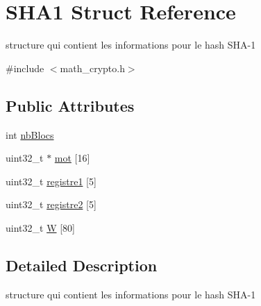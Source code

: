 \hypertarget{structSHA1}{\section{S\-H\-A1 Struct Reference}
\label{structSHA1}
}


structure qui contient les informations pour le hash S\-H\-A-\/1  




{\ttfamily \#include $<$math\-\_\-crypto.\-h$>$}

\subsection*{Public Attributes}
\begin{DoxyCompactItemize}
\item 
int \hyperlink{structSHA1_a7786a6dad7d75fbcba1208cf88d113df}{nb\-Blocs}
\item 
uint32\-\_\-t $\ast$ \hyperlink{structSHA1_acf9883e8bc9fcdf15922a5272ccba15f}{mot} \mbox{[}16\mbox{]}
\item 
uint32\-\_\-t \hyperlink{structSHA1_ac1d1253a9da2c2810eabb0fb2468fcbe}{registre1} \mbox{[}5\mbox{]}
\item 
uint32\-\_\-t \hyperlink{structSHA1_af7e071a688c313290f010f7602143c4f}{registre2} \mbox{[}5\mbox{]}
\item 
uint32\-\_\-t \hyperlink{structSHA1_adc45ee074d3aef3f5d891e5f294cffb0}{W} \mbox{[}80\mbox{]}
\end{DoxyCompactItemize}


\subsection{Detailed Description}
structure qui contient les informations pour le hash S\-H\-A-\/1 

